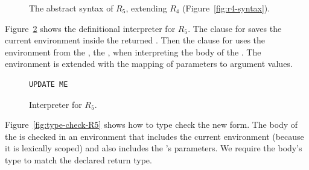 \documentclass[11pt]{book}
\newcommand{\gray}[1]{{\color{gray} #1}}
\begin{document}
\begin{figure}[tp]
\centering
\fbox{
  \begin{minipage}{0.96\textwidth}
    \small
\[
\begin{array}{lcl}
  \itm{op} &::=& \ldots \mid \code{procedure-arity} \\
  \Exp &::=& \gray{ \INT{\Int} \VAR{\Var} \mid \LET{\Var}{\Exp}{\Exp} } \\
       &\mid& \gray{ \PRIM{\itm{op}}{\Exp\ldots} }\\
     &\mid& \gray{ \BOOL{\itm{bool}}
      \mid \IF{\Exp}{\Exp}{\Exp} } \\
     &\mid& \gray{ \VOID{} \mid \LP\key{HasType}~\Exp~\Type \RP 
     \mid \APPLY{\Exp}{\Exp\ldots} }\\
     &\mid& \LAMBDA{\LP\LS\Var\code{:}\Type\RS\ldots\RP}{\Type}{\Exp}\\
 \Def &::=& \gray{ \FUNDEF{\Var}{\LP\LS\Var \code{:} \Type\RS\ldots\RP}{\Type}{\code{'()}}{\Exp} }\\
  R_5 &::=& \gray{ \PROGRAMDEFSEXP{\code{'()}}{\LP\Def\ldots\RP}{\Exp} }
\end{array}
\]
\end{minipage}
}
\caption{The abstract syntax of $R_5$, extending $R_4$ (Figure~\ref{fig:r4-syntax}).}
\label{fig:r5-syntax}
\end{figure}

\label{sec:interp-R5}

Figure~\ref{fig:interp-R5} shows the definitional interpreter for
$R_5$. The clause for  saves the current environment
inside the returned . Then the clause for  uses
the environment from the , the , when
interpreting the body of the .  The 
environment is extended with the mapping of parameters to argument
values.

\begin{figure}[tbp]
\begin{lstlisting}
UPDATE ME
\end{lstlisting}
\caption{Interpreter for $R_5$.}
\label{fig:interp-R5}
\end{figure}


\label{sec:type-check-r5}

Figure~\ref{fig:type-check-R5} shows how to type check the new
 form. The body of the  is checked in an
environment that includes the current environment (because it is
lexically scoped) and also includes the 's parameters.  We
require the body's type to match the declared return type.
\end{document}
